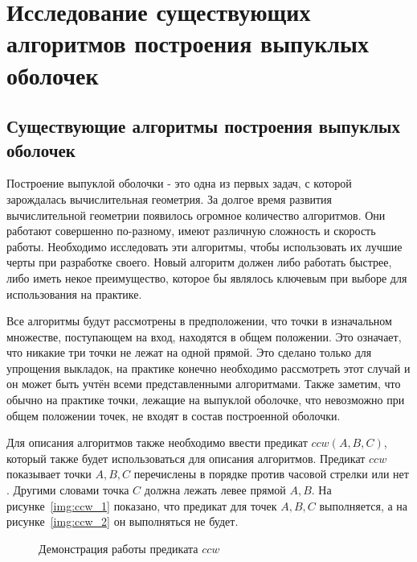 \chapter{Исследование существующих алгоритмов построения выпуклых оболочек} \label{chapt1}

\section{Существующие алгоритмы построения выпуклых оболочек} \label{sect1_1}

Построение выпуклой оболочки - это одна из первых задач, с которой зарождалась вычислительная геометрия\cite{chadnov2004algorithmsComparison}. За долгое время развития вычислительной геометрии появилось огромное количество алгоритмов. Они работают совершенно по-разному, имеют различную сложность и скорость работы. Необходимо исследовать эти алгоритмы, чтобы использовать их лучшие черты при разработке своего. Новый алгоритм должен либо работать быстрее, либо иметь некое преимущество, которое бы являлось ключевым при выборе для использования на практике.

Все алгоритмы будут рассмотрены в предположении, что точки в изначальном множестве, поступающем на вход, находятся в общем положении. Это означает, что никакие три точки не лежат на одной прямой. Это сделано только для упрощения выкладок, на практике конечно необходимо рассмотреть этот случай и он может быть учтён всеми представленными алгоритмами. Также заметим, что обычно на практике точки, лежащие на выпуклой оболочке, что невозможно при общем положении точек, не входят в состав построенной оболочки.

Для описания алгоритмов также необходимо ввести предикат $ccw(A, B, C)$, который также будет использоваться для описания алгоритмов. Предикат $ccw$ показывает точки $A, B, C$ перечислены в порядке против часовой стрелки или нет \cite{pichardie2001formalizing}. Другими словами точка $C$ должна лежать левее прямой $A, B$. На рисунке~\ref{img:ccw_1} показано, что предикат для точек $A, B, C$ выполняется, а на рисунке~\ref{img:ccw_2} он выполняться не будет.

\begin{figure}[H]
	{\centering
		\hfill
		\subbottom[\label{img:ccw_1}]{%
			}
		\hfill
		\subbottom[\label{img:ccw_2}]{%
			}
		\hfill
	}
	\caption{Демонстрация работы предиката $ccw$}
	\label{img:ccw}
\end{figure}

